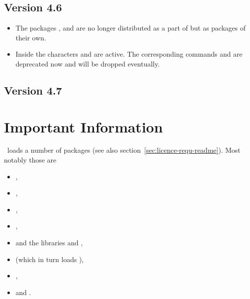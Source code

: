\documentclass[load-preamble+]{cnltx-doc}
\begin{document}
\subsection{Version 4.6}
\begin{itemize}
  \item The packages \chemformula, \chemgreek{} and \ghsystem{} are no longer
    distributed as a part of \chemmacros{} but as packages of their own.
  \item Inside  the characters \code{\textbar} and
    \code{\textasciicircum} are active.  The corresponding commands
    \cs{\textbar} and \cs{\textasciicircum} are deprecated now and will be
    dropped eventually.
\end{itemize}

\subsection{Version 4.7}

\section{Important Information}\label{sec:import-inform}
\chemmacros\ loads a number of packages (see also
section~\ref{sec:licence-requ-readme}).  Most notably those are
\begin{itemize}
  \item {},
  \item {},
  \item {},
  \item {},
  \item {} and the libraries  and ,
  \item {} (which in turn loads ),
  \item {},
  \item {} and .
\end{itemize}
\end{document}
